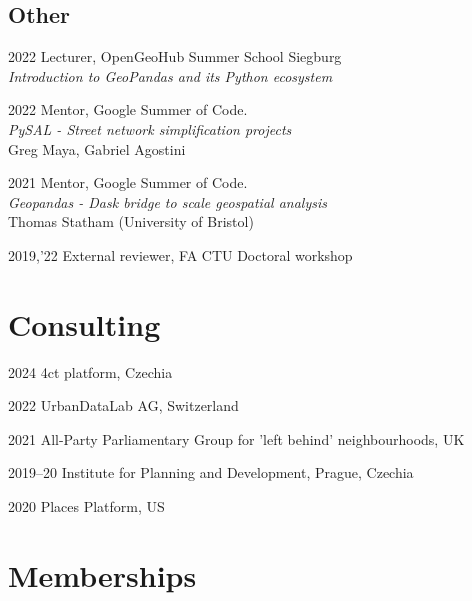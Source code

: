 \documentclass[12pt,a4paper]{report}
\begin{document}
    \subsection*{Other}

    \begin{tablist}

        \item[2022] \tab{}Lecturer, OpenGeoHub Summer School Siegburg \\
                          \textit{Introduction to GeoPandas and its Python ecosystem}

        \item[2022] \tab{}Mentor, Google Summer of Code. \\
                          \textit{PySAL - Street network simplification projects} \\
                          Greg Maya, Gabriel Agostini

        \item[2021] \tab{}Mentor, Google Summer of Code. \\
                          \textit{Geopandas - Dask bridge to scale geospatial analysis} \\
                          Thomas Statham (University of Bristol)

        \item[2019,'22] \tab{}External reviewer, FA CTU Doctoral workshop

    \end{tablist}

    \section*{Consulting}

    \begin{tablist}

        \item[2024] \tab{}4ct platform, Czechia
        \item[2022] \tab{}UrbanDataLab AG, Switzerland
        \item[2021] \tab{}All-Party Parliamentary Group for 'left behind' neighbourhoods, UK
        \item[2019--20] \tab{}Institute for Planning and Development, Prague, Czechia
        \item[2020] \tab{}Places Platform, US

    \end{tablist}


    \section*{Memberships}
\end{document}
